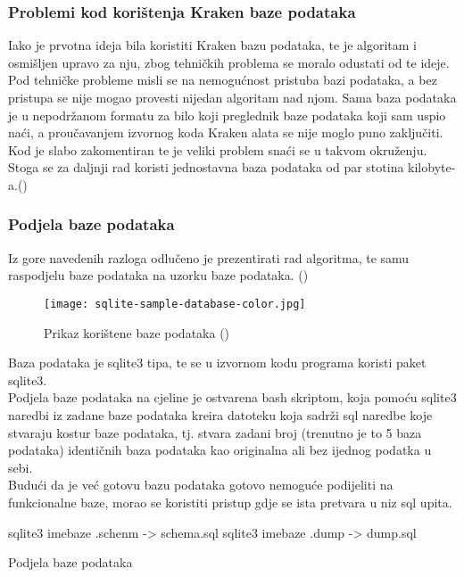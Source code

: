 \documentclass[times, utf8, zavrsni]{fer}
\begin{document}
\subsubsection{Problemi kod korištenja Kraken baze podataka}

Iako je prvotna ideja bila koristiti Kraken bazu podataka, te je algoritam i osmišljen upravo za nju, zbog tehničkih problema se moralo odustati od te ideje. Pod tehničke probleme misli se na nemogućnost pristuba bazi podataka, a bez pristupa se nije mogao provesti nijedan algoritam nad njom. Sama baza podataka je u nepodržanom formatu za bilo koji preglednik baze podataka koji sam uspio naći, a proučavanjem izvornog koda Kraken alata se nije moglo puno zaključiti. Kod je slabo zakomentiran te je veliki problem snaći se u takvom okruženju. Stoga se za daljnji rad koristi jednostavna baza podataka od par stotina kilobyte-a.(\cite{Database})

\subsubsection{Podjela baze podataka}
Iz gore navedenih razloga odlučeno je prezentirati rad algoritma, te samu raspodjelu baze podataka na uzorku baze podataka. (\cite{Database})
\begin{figure}[!htbp]
	\centering
	\texttt{[image: sqlite-sample-database-color.jpg]}
	\caption{Prikaz korištene baze podataka (\cite{Database})}
	\label{Db}
\end{figure}
Baza podataka je sqlite3 tipa, te se u izvornom kodu programa koristi paket sqlite3.\\
Podjela baze podataka na cjeline je ostvarena bash skriptom, koja  pomoću sqlite3 naredbi iz zadane baze podataka kreira datoteku koja sadrži sql naredbe koje stvaraju kostur baze podataka, tj. stvara zadani broj (trenutno je to 5 baza podataka) identičnih baza podataka kao originalna ali bez ijednog podatka u sebi.\\ Budući da je već gotovu bazu podataka gotovo nemoguće podijeliti na funkcionalne baze, morao se koristiti pristup gdje se ista pretvara u niz sql upita.

\begin{algorithm}[H]
		sqlite3 imebaze .schenm -> schema.sql\;
		sqlite3 imebaze .dump -> dump.sql\;
	\caption{Podjela baze podataka}
	\label{PodjelaBp}
\end{algorithm}
\end{document}
